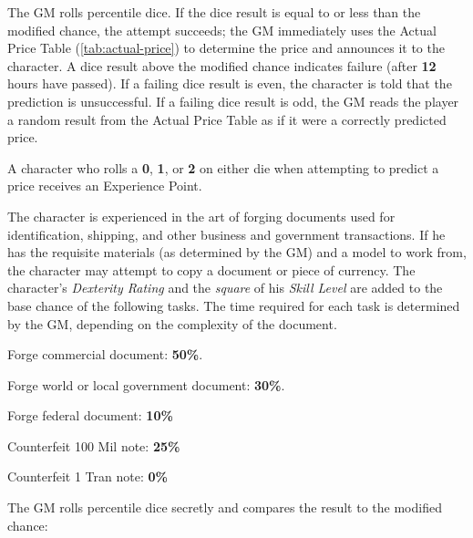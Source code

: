 The GM rolls percentile dice.  If the dice result is equal to or less
than the modified chance, the attempt succeeds; the GM immediately
uses the Actual Price Table (\ref{tab:actual-price}) to determine the price
and announces it to the character.  A dice result above the modified
chance indicates failure (after \textbf{12} hours have passed).  If a
failing dice result is even, the character is told that the prediction
is unsuccessful.  If a failing dice result is odd, the GM reads the
player a random result from the Actual Price Table as if it were a
correctly predicted price.

A character who rolls a \textbf{0}, \textbf{1}, or \textbf{2} on
either die when attempting to predict a price receives an Experience
Point.

\label{sec:skill-forgery-counterfeiting}

The character is experienced in the art of forging documents used for
identification, shipping, and other business and government
transactions.  If he has the requisite materials (as determined by the
GM) and a model to work from, the character may attempt to copy a
document or piece of currency.  The character's \emph{Dexterity Rating}
and the \emph{square} of his \emph{Skill Level} are added to the base
chance of the following tasks.  The time required for each task is
determined by the GM, depending on the complexity of the document.

\begin{tasklist}
\item Forge commercial document: \textbf{50\%}.
\item Forge world or local government document: \textbf{30\%}.
\item Forge federal document: \textbf{10\%}
\item Counterfeit 100 Mil note: \textbf{25\%}
\item Counterfeit 1 Tran note: \textbf{0\%}
\end{tasklist}

The GM rolls percentile dice secretly and compares the result to the
modified chance:

